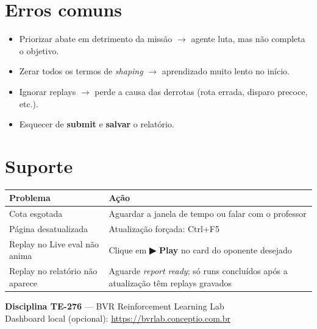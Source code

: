 \documentclass[11pt,a4paper]{article}
\begin{document}
\section{Erros comuns}
\begin{itemize}[nosep]
  \item Priorizar abate em detrimento da missão $\rightarrow$ agente luta, mas não completa o objetivo.
  \item Zerar todos os termos de \emph{shaping} $\rightarrow$ aprendizado muito lento no início.
  \item Ignorar replays $\rightarrow$ perde a causa das derrotas (rota errada, disparo precoce, etc.).
  \item Esquecer de \textbf{submit} e \textbf{salvar} o relatório.
\end{itemize}

\section{Suporte}
\begin{tabular}{@{}ll@{}}
  \toprule
  Problema & Ação \\
  \midrule
  Cota esgotada & Aguardar a janela de tempo ou falar com o professor \\
  Página desatualizada & Atualização forçada: Ctrl+F5 \\
  Replay no Live eval não anima & Clique em \textbf{▶ Play} no card do oponente desejado \\
  Replay no relatório não aparece & Aguarde \emph{report ready}; só runs concluídos após a atualização têm replays gravados \\
  \bottomrule
\end{tabular}

\vfill
\begin{center}
  \small \textbf{Disciplina TE-276} — BVR Reinforcement Learning Lab\\
  Dashboard local (opcional): \url{https://bvrlab.conceptio.com.br}
\end{center}
\end{document}
